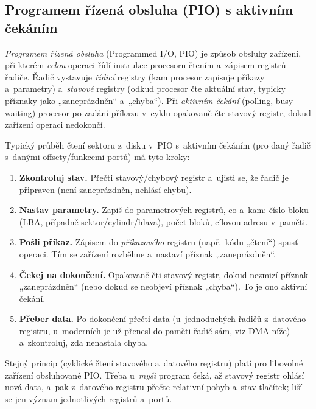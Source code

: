 \subsection{Programem řízená obsluha (PIO) s aktivním čekáním}

\begin{definice}
\emph{Programem řízená obsluha} (Programmed I/O, PIO) je způsob obsluhy zařízení, při kterém \emph{celou} operaci řídí instrukce procesoru čtením a~zápisem registrů řadiče. Řadič vystavuje \emph{řídicí} registry (kam procesor zapisuje příkazy a~parametry) a~\emph{stavové} registry (odkud procesor čte aktuální stav, typicky příznaky jako „zaneprázdněn`` a~„chyba``). Při \emph{aktivním čekání} (polling, busy-waiting) procesor po zadání příkazu v~cyklu opakovaně čte stavový registr, dokud zařízení operaci nedokončí.
\end{definice}

Typický průběh čtení sektoru z~disku v~PIO s~aktivním čekáním (pro daný řadič s~danými offsety/funkcemi portů) má tyto kroky:

\begin{enumerate}[label=(\arabic*)]
\item \textbf{Zkontroluj stav.} Přečti stavový/chybový registr a~ujisti se, že řadič je připraven (není zaneprázdněn, nehlásí chybu).
\item \textbf{Nastav parametry.} Zapiš do parametrových registrů, co a~kam: číslo bloku (LBA, případně sektor/cylindr/hlava), počet bloků, cílovou adresu v~paměti.
\item \textbf{Pošli příkaz.} Zápisem do \emph{příkazového} registru (např.\ kódu „čtení``) spusť operaci. Tím se zařízení rozběhne a~nastaví příznak „zaneprázdněn``.
\item \textbf{Čekej na dokončení.} Opakovaně čti stavový registr, dokud nezmizí příznak „zaneprázdněn`` (nebo dokud se neobjeví příznak „chyba``). To je ono aktivní čekání.
\item \textbf{Přeber data.} Po dokončení přečti data (u~jednoduchých řadičů z~datového registru, u~moderních je už přenesl do paměti řadič sám, viz DMA níže) a~zkontroluj, zda nenastala chyba.
\end{enumerate}

Stejný princip (cyklické čtení stavového a~datového registru) platí pro libovolné zařízení obsluhované PIO. Třeba u~\emph{myši} program čeká, až stavový registr ohlásí nová data, a~pak z~datového registru přečte relativní pohyb a~stav tlačítek; liší se jen význam jednotlivých registrů a~portů.

